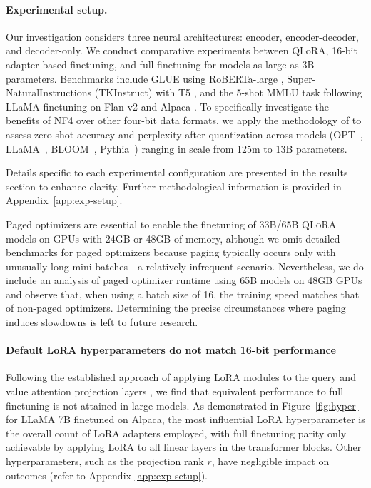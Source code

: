\paragraph{Experimental setup.} Our investigation considers three neural architectures: encoder, encoder-decoder, and decoder-only. We conduct comparative experiments between QLoRA, 16-bit adapter-based finetuning, and full finetuning for models as large as 3B parameters. Benchmarks include GLUE \citep{wang2018glue} using RoBERTa-large \citep{liu2019roberta}, Super-NaturalInstructions (TKInstruct) \citep{wang2022super} with T5 \citep{t5}, and the 5-shot MMLU task \citep{hendrycksmeasuring} following LLaMA finetuning on Flan v2 \citep{longpre2023flan} and Alpaca \citep{alpaca}. To specifically investigate the benefits of NF4 over other four-bit data formats, we apply the methodology of \citet{dettmers2022case} to assess zero-shot accuracy and perplexity after quantization across models (OPT~\citep{zhang2022opt}, LLaMA~\citep{touvron2023llama}, BLOOM~\citep{scao2022bloom}, Pythia~\citep{biderman2023pythia}) ranging in scale from 125m to 13B parameters.

Details specific to each experimental configuration are presented in the results section to enhance clarity. Further methodological information is provided in Appendix~\ref{app:exp-setup}.

Paged optimizers are essential to enable the finetuning of 33B/65B \textsc{QLoRA} models on GPUs with 24GB or 48GB of memory, although we omit detailed benchmarks for paged optimizers because paging typically occurs only with unusually long mini-batches—a relatively infrequent scenario. Nevertheless, we do include an analysis of paged optimizer runtime using 65B models on 48GB GPUs and observe that, when using a batch size of 16, the training speed matches that of non-paged optimizers. Determining the precise circumstances where paging induces slowdowns is left to future research.

\paragraph{Default LoRA hyperparameters do not match 16-bit performance}

Following the established approach of applying LoRA modules to the query and value attention projection layers \citep{hu2021lora}, we find that equivalent performance to full finetuning is not attained in large models. As demonstrated in Figure~\ref{fig:hyper} for LLaMA 7B finetuned on Alpaca, the most influential LoRA hyperparameter is the overall count of LoRA adapters employed, with full finetuning parity only achievable by applying LoRA to all linear layers in the transformer blocks. Other hyperparameters, such as the projection rank $r$, have negligible impact on outcomes (refer to Appendix \ref{app:exp-setup}).

